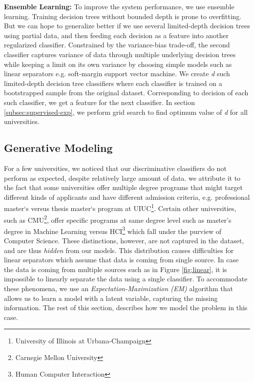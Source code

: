 \documentclass{sig-alternate-05-2015}
\begin{document}
\textbf{Ensemble Learning:}
To improve the system performance, we use ensemble learning. Training decision trees without bounded depth is prone to overfitting. But we can hope to generalize better if we use several limited-depth decision trees using partial data, and then feeding each decision as a feature into another regularized classifier. Constrained by the variance-bias trade-off, the second classifier captures variance of data through multiple underlying decision trees while keeping a limit on its own variance by choosing simple models such as linear separators e.g. soft-margin support vector machine. We create \textit{d} such limited-depth decision tree classifiers where each classifier is trained on a bootstrapped sample from the original dataset. Corresponding to decision of each such classifier, we get a feature for the next classifier. In section \ref{subsec:supervised-exp}, we perform grid search to find optimum value of \textit{d} for all universities.



\subsection{Generative Modeling}
\label{subsec:generative-modeling}
For a few universities, we noticed that our discriminative classifiers do not perform as expected, despite relatively large amount of data. we attribute it to the fact that some universities offer multiple degree programs that might target different kinds of applicants and have different admission criteria, e.g. professional master`s versus thesis master`s program at UIUC\footnote{University of Illinois at Urbana-Champaign}. Certain other universities, such as CMU\footnote{Carnegie Mellon University}, offer specific programs at same degree level such as master's degree in Machine Learning versus HCI\footnote{Human Computer Interaction} which fall under the purview of Computer Science. These distinctions, however, are not captured in the dataset, and are thus \textit{hidden} from our models. This distribution causes difficulties for linear separators which assume that data is coming from single source. In case the data is coming from multiple sources such as in Figure \ref{fig:linear}, it is impossible to linearly separate the data using a single classifier. To accommodate these phenomena, we use an \textit{Expectation-Maximization (EM)} algorithm that allows us to learn a model with a latent variable, capturing the missing information. The rest of this section, describes how we model the problem in this case. 
\end{document}
